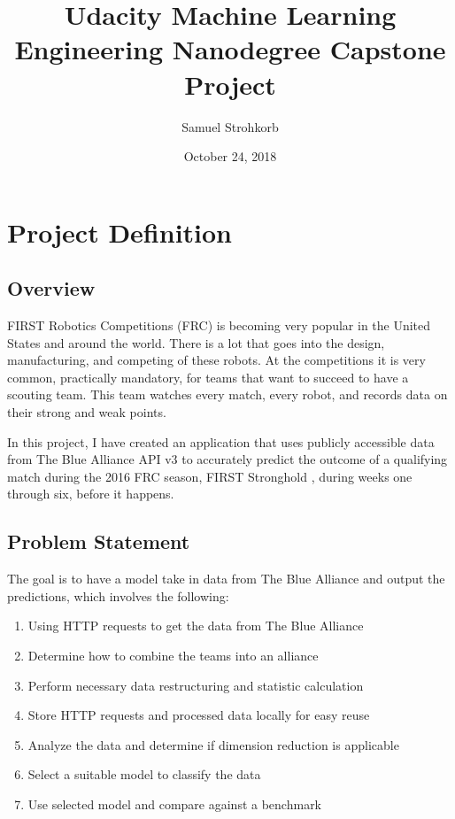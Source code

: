 \documentclass{article}
\title{Udacity Machine Learning Engineering Nanodegree Capstone Project}
\author{Samuel Strohkorb}
\date{October 24, 2018}
\begin{document}
\maketitle

\section{Project Definition}
\subsection{Overview}
\par
FIRST Robotics Competitions (FRC) is becoming very popular in the United States and around the world. There is a lot that goes into the design, manufacturing, and competing of these robots. At the competitions it is very common, practically mandatory, for teams that want to succeed to have a scouting team. This team watches every match, every robot, and records data on their strong and weak points.
\par
In this project, I have created an application that uses publicly accessible data from The Blue Alliance API v3 \citep{thebluealliance} to accurately predict the outcome of a qualifying match during the 2016 FRC season, FIRST Stronghold \citep{firststronghold}, during weeks one through six, before it happens.

\subsection{Problem Statement}
\par
The goal is to have a model take in data from The Blue Alliance and output the predictions, which involves the following:
\begin{enumerate}
    \item Using HTTP requests to get the data from The Blue Alliance
    \item Determine how to combine the teams into an alliance
    \item Perform necessary data restructuring and statistic calculation
    \item Store HTTP requests and processed data locally for easy reuse
    \item Analyze the data and determine if dimension reduction is applicable
    \item Select a suitable model to classify the data
    \item Use selected model and compare against a benchmark
\end{enumerate}
\end{document}
